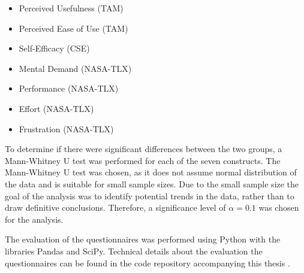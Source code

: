 \begin{itemize}
    \item Perceived Usefulness (\ac{TAM})
    \item Perceived Ease of Use (\ac{TAM})
    \item Self-Efficacy (\ac{CSE})
    \item Mental Demand (\acs{NASA}-\ac{TLX})
    \item Performance (\acs{NASA}-\ac{TLX})
    \item Effort (\acs{NASA}-\ac{TLX})
    \item Frustration (\acs{NASA}-\ac{TLX})
\end{itemize}

To determine if there were significant differences between the two groups, a Mann-Whitney U test was performed for each of the seven constructs. The Mann-Whitney U test was chosen, as it does not assume normal distribution of the data and is suitable for small sample sizes. Due to the small sample size the goal of the analysis was to identify potential trends in the data, rather than to draw definitive conclusions. Therefore, a significance level of $\alpha = 0.1$ was chosen for the analysis.

The evaluation of the questionnaires was performed using Python with the libraries Pandas and SciPy. Technical details about the evaluation the questionnaires can be found in the code repository accompanying this thesis \parencite{Goepfert2025}.
